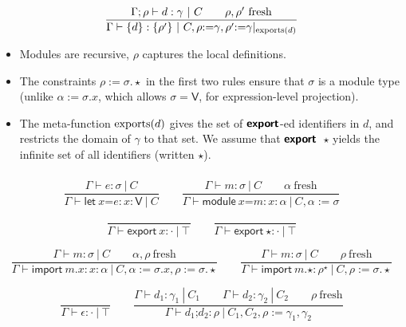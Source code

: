 \documentclass[10pt,a4paper]{article}
\newcommand\ff[1]{\ensuremath{\mathbin{\mathrm{#1\null}}}\xspace}
\newcommand\y[1]{\ensuremath{\mathsf{#1}}\xspace}
\newcommand\K[1]{\ensuremath{\textsf{#1}}}
\newcommand\KK[1]{\ensuremath{\K{\textbf{#1}}}}
\newcommand\note[1]{\noindent #1}
\begin{document}
$$
\frac{
  \Gamma; \rho \vdash d : \gamma ~|~ C
  \qquad
  \rho,\rho'~\mathrm{fresh}
}{
  \Gamma \vdash \{d\} : \{\rho'\} ~|~ C, \rho{:=}\gamma, \rho'{:=}\gamma|_{\ff{exports}(d)}
}
$$

\note{
\begin{itemize}
\item Modules are recursive, $\rho$ captures the local definitions.
\item The constraints $\rho{:=}\sigma.{\star}$ in the first two rules ensure that $\sigma$ is a module type (unlike $\alpha{:=}\sigma.x$, which allows $\sigma=\y{V}$, for expression-level projection).
\item The meta-function $\ff{exports}(d)$ gives the set of \KK{export}-ed identifiers in $d$, and restricts the domain of $\gamma$ to that set.
We assume that \KK{export}~$\star$ yields the infinite set of all identifiers (written $\star$).
\end{itemize}
}


\subsubsection*{}

$$
\frac{
  \Gamma \vdash e : \sigma ~|~ C
}{
  \Gamma \vdash \K{let}~x\K=e : x{:}\y{V} ~|~ C
}
\qquad
\frac{
  \Gamma \vdash m : \sigma ~|~ C
  \qquad
  \alpha~\mathrm{fresh}
}{
  \Gamma \vdash \K{module}~x\K=m : x{:}\alpha ~|~ C, \alpha{:=}\sigma
}
$$

$$
\frac{
}{
  \Gamma \vdash \K{export}~x : {\cdot} ~|~ \top
}
\qquad
\frac{
}{
  \Gamma \vdash \K{export}~{\star} : {\cdot} ~|~ \top
}
$$

$$
\frac{
  \Gamma \vdash m : \sigma ~|~ C
  \qquad
  \alpha,\rho~\mathrm{fresh}
}{
  \Gamma \vdash \K{import}~m\K.x : x{:}\alpha ~|~ C, \alpha{:=}\sigma.x, \rho{:=}\sigma.{\star}
}
\qquad
\frac{
  \Gamma \vdash m : \sigma ~|~ C
  \qquad
  \rho~\mathrm{fresh}
}{
  \Gamma \vdash \K{import}~m\K.{\star} : \rho^\star ~|~ C, \rho{:=}\sigma.{\star}
}
$$

$$
\frac{
}{
  \Gamma \vdash \epsilon : {\cdot} ~|~ \top
}
\qquad
\frac{
  \Gamma \vdash d_1 : \gamma_1 ~|~ C_1
  \qquad
  \Gamma \vdash d_2 : \gamma_2 ~|~ C_2
  \qquad
  \rho~\mathrm{fresh}
}{
  \Gamma \vdash d_1\K;d_2 : \rho ~|~ C_1, C_2, \rho{:=}\gamma_1,\gamma_2
}
$$
\end{document}
